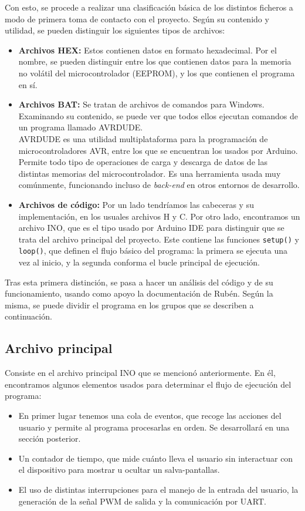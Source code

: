 Con esto, se procede a realizar una clasificación básica de los distintos ficheros a modo de primera toma de contacto con el proyecto. Según su contenido y utilidad, se pueden distinguir los siguientes tipos de archivos:

\begin{itemize}
    \item{\textbf{Archivos HEX:}} Estos contienen datos en formato hexadecimal. Por el nombre, se pueden distinguir entre los que contienen datos para la memoria no volátil del microcontrolador (EEPROM), y los que contienen el programa en sí.
    \item{\textbf{Archivos BAT:}} Se tratan de archivos de comandos para Windows. Examinando su contenido, se puede ver que todos ellos ejecutan comandos de un programa llamado AVRDUDE.\\
    AVRDUDE es una utilidad multiplataforma para la programación de microcontroladores AVR, entre los que se encuentran los usados por Arduino. Permite todo tipo de operaciones de carga y descarga de datos de las distintas memorias del microcontrolador. Es una herramienta usada muy comúnmente, funcionando incluso de \textit{back-end} en otros entornos de desarrollo.
    \item{\textbf{Archivos de código:}} Por un lado tendríamos las cabeceras y su implementación, en los usuales archivos H y C. Por otro lado, encontramos un archivo INO, que es el tipo usado por Arduino IDE para distinguir que se trata del archivo principal del proyecto. Este contiene las funciones \verb|setup()| y \verb|loop()|, que definen el flujo básico del programa: la primera se ejecuta una vez al inicio, y la segunda conforma el bucle principal de ejecución.
\end{itemize}

Tras esta primera distinción, se pasa a hacer un análisis del código y de su funcionamiento, usando como apoyo la documentación de Rubén. Según la misma, se puede dividir el programa en los grupos que se describen a continuación.

\subsection{Archivo principal}

Consiste en el archivo principal INO que se mencionó anteriormente. En él, encontramos algunos elementos usados para determinar el flujo de ejecución del programa:

\begin{itemize}
    \item En primer lugar tenemos una cola de eventos, que recoge las acciones del usuario y permite al programa procesarlas en orden. Se desarrollará en una sección posterior.
    \item Un contador de tiempo, que mide cuánto lleva el usuario sin interactuar con el dispositivo para mostrar u ocultar un salva-pantallas.
    \item El uso de distintas interrupciones para el manejo de la entrada del usuario, la generación de la señal PWM de salida y la comunicación por UART. \end{itemize}

